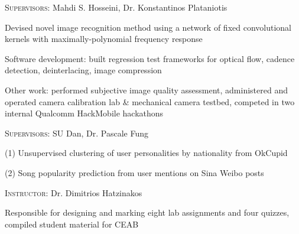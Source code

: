 \documentclass[12pt]{cv_style}
\begin{document}
%
\textsc{Supervisors:} Mahdi S. Hosseini, Dr. Konstantinos Plataniotis
\begin{ditem}
	\item Devised novel image recognition method using a network of fixed convolutional kernels with maximally-polynomial frequency response
\end{ditem}
%
\begin{ditem}
	\item Software development: built regression test frameworks for optical flow, cadence detection, deinterlacing, image compression
	\item Other work: performed subjective image quality assessment, administered and operated camera calibration lab \& mechanical camera testbed, competed in two internal Qualcomm HackMobile hackathons
\end{ditem}
%
\textsc{Supervisors:} SU Dan, Dr. Pascale Fung
\begin{ditem}
	\item (1) Unsupervised clustering of user personalities by nationality from OkCupid
	\item (2) Song popularity prediction from user mentions on Sina Weibo posts
\end{ditem}
%

\textsc{Instructor:} Dr. Dimitrios Hatzinakos\\
\begin{ditem}
	\item Responsible for designing and marking eight lab assignments and four quizzes, compiled student material for CEAB
\end{ditem}

%
\end{document}
